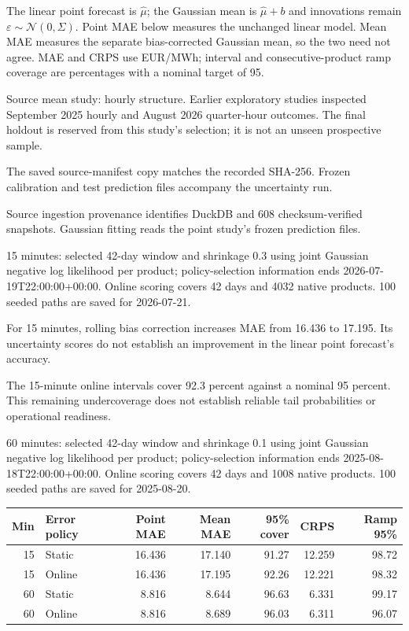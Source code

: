 \documentclass[11pt,a4paper]{article}
\begin{document}
The linear point forecast is $\widehat\mu$; the Gaussian mean is $\widehat\mu+b$ and innovations remain $\varepsilon\sim\mathcal N(0,\Sigma)$. Point MAE below measures the unchanged linear model. Mean MAE measures the separate bias-corrected Gaussian mean, so the two need not agree. MAE and CRPS use EUR/MWh; interval and consecutive-product ramp coverage are percentages with a nominal target of 95.

Source mean study: hourly structure. Earlier exploratory studies inspected September 2025 hourly and August 2026 quarter-hour outcomes. The final holdout is reserved from this study's selection; it is not an unseen prospective sample.

The saved source-manifest copy matches the recorded SHA-256. Frozen calibration and test prediction files accompany the uncertainty run.

Source ingestion provenance identifies DuckDB  and 608 checksum-verified snapshots. Gaussian fitting reads the point study's frozen prediction files.

15 minutes: selected 42-day window and shrinkage 0.3 using joint Gaussian negative log likelihood per product; policy-selection information ends 2026-07-19T22:00:00+00:00. Online scoring covers 42 days and 4032 native products. 100 seeded paths are saved for 2026-07-21.

For 15 minutes, rolling bias correction increases MAE from 16.436 to 17.195. Its uncertainty scores do not establish an improvement in the linear point forecast's accuracy.

The 15-minute online intervals cover 92.3 percent against a nominal 95 percent. This remaining undercoverage does not establish reliable tail probabilities or operational readiness.

60 minutes: selected 42-day window and shrinkage 0.1 using joint Gaussian negative log likelihood per product; policy-selection information ends 2025-08-18T22:00:00+00:00. Online scoring covers 42 days and 1008 native products. 100 seeded paths are saved for 2025-08-20.

{\scriptsize\begin{longtable}{rlrrrrr}
\toprule Min & Error policy & Point MAE & Mean MAE & 95\% cover & CRPS & Ramp 95\% \\ \midrule
\endhead
15 & Static & 16.436 & 17.140 & 91.27 & 12.259 & 98.72 \\
15 & Online & 16.436 & 17.195 & 92.26 & 12.221 & 98.32 \\
60 & Static & 8.816 & 8.644 & 96.63 & 6.331 & 99.17 \\
60 & Online & 8.816 & 8.689 & 96.03 & 6.311 & 96.07 \\
\bottomrule\end{longtable}}
\end{document}
